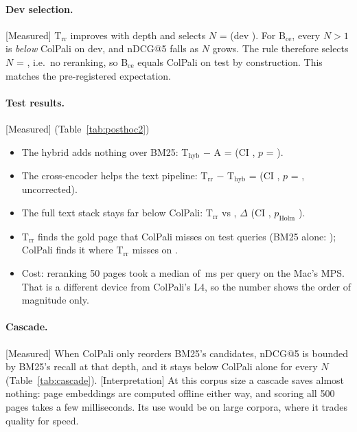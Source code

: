 \documentclass[11pt,a4paper]{article}
\newcommand{\lbl}[2]{\textsf{\scriptsize\textcolor{#1}{[#2]}}}
\newcommand{\Int}{\lbl{tagI}{Interpretation}}
\newcommand{\Mea}{\lbl{tagM}{Measured}}
\newcommand{\file}[1]{\texttt{\small\hyphenchar\font=`\/ #1}}
\begin{document}
\paragraph{Dev selection.} \Mea{} T$_\text{rr}$ improves with depth and selects $N$ = \nTrr{} (dev \devTrr{}). For B$_\text{ce}$, every $N > 1$ is \emph{below} ColPali on dev, and nDCG@5 falls as $N$ grows. The rule therefore selects $N$ = \nBce{}, i.e.\ no reranking, so B$_\text{ce}$ equals ColPali on test by construction. This matches the pre-registered expectation.

\paragraph{Test results.} \Mea{} (Table~\ref{tab:posthoc2})
\begin{itemize}
  \item The hybrid adds nothing over BM25: T$_\text{hyb}$ $-$ A = \deltaThybA{} (CI \deltaThybACI{}, $p$ = \pThybA{}).
  \item The cross-encoder helps the text pipeline: T$_\text{rr}$ $-$ T$_\text{hyb}$ = \deltaTrrThyb{} (CI \deltaTrrThybCI{}, $p$ = \pTrrThyb{}, uncorrected).
  \item The full text stack stays far below ColPali: T$_\text{rr}$ \testTrr{} vs \testB{}, $\Delta$ \deltaTrr{} (CI \deltaTrrCI{}, $p_\text{Holm}$ \pHolmTrr{}).
  \item T$_\text{rr}$ finds the gold page that ColPali misses on \headTrrOnly{} test queries (BM25 alone: \headallAnotB{}); ColPali finds it where T$_\text{rr}$ misses on \headTrrBOnly{}.
  \item Cost: reranking 50 pages took a median of \latTrr{}\,ms per query on the Mac's MPS. That is a different device from ColPali's L4, so the number shows the order of magnitude only.
\end{itemize}

\begin{table}[!htbp]\centering\small

\caption{\Mea{} Post-hoc set 2 on the test split (\file{results/posthoc2/metrics.json}).}\label{tab:posthoc2}
\end{table}

\paragraph{Cascade.} \Mea{} When ColPali only reorders BM25's candidates, nDCG@5 is bounded by BM25's recall at that depth, and it stays below ColPali alone for every $N$ (Table~\ref{tab:cascade}). \Int{} At this corpus size a cascade saves almost nothing: page embeddings are computed offline either way, and scoring all 500 pages takes a few milliseconds. Its use would be on large corpora, where it trades quality for speed.
\end{document}
